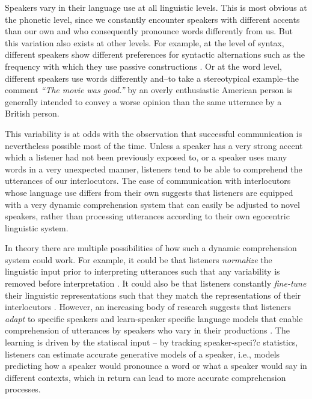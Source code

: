 Speakers vary in their language use at all linguistic levels. This is most obvious at the phonetic level, since we constantly encounter speakers with different accents than our own and who consequently pronounce words differently from us. But this variation also exists at other levels. For example, at the level of syntax, different speakers show different preferences for syntactic alternations such as the frequency with which they use passive constructions \cite{Weiner1983}. Or at the word level, different speakers use words differently and--to take a stereotypical example--the comment \textit{``The movie was good.''} by an overly enthusiastic American person is generally intended to convey a worse opinion than the same utterance by a British person.

This variability is at odds with the observation that successful communication is nevertheless possible most of the time. Unless a speaker has a very strong accent which a listener had not been previously exposed to, or a speaker uses many words in a very unexpected manner, listeners tend to be able to comprehend the utterances of our interlocutors. The ease of communication with interlocutors whose language use differs from their own suggests that listeners are equipped with a very dynamic comprehension system that can easily be adjusted to novel speakers, rather than processing utterances according to their own egocentric linguistic system.

In theory there are multiple possibilities of how such a dynamic comprehension system could work. For example, it could be that listeners \textit{normalize} the linguistic input prior to interpreting utterances such that any variability is removed before interpretation \cite{e.g,NewmanSawusch1996}. It could also be that listeners constantly \textit{fine-tune} their linguistic representations such that they match the representations of their interlocutors \cite{e.g, PickeringGarrod2004}. However, an increasing body of research suggests that listeners \textit{adapt} to specific speakers and learn-speaker specific language models that enable comprehension of utterances by speakers who vary in their productions \cite{Norris2003,Kraljic2007,Bradlow2008, Kamide2012,Kleinschmidt2015,Fine2016,Roettger2018}. The learning is driven by the statiscal input -- by tracking speaker-speci?c statistics, listeners can estimate accurate generative models of a speaker, i.e., models predicting how a speaker would pronounce a word or what a speaker would say in different contexts, which in return can lead to more accurate comprehension processes.

